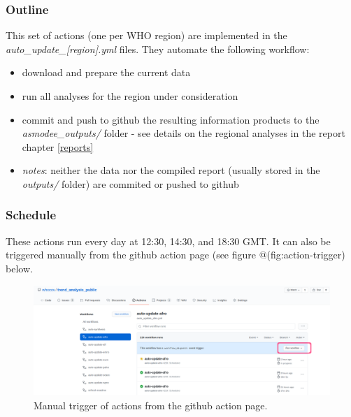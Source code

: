 \documentclass[]{book}
\providecommand{\tightlist}{%
  \setlength{\itemsep}{0pt}\setlength{\parskip}{0pt}}
\begin{document}
\hypertarget{outline}{%
\subsubsection{Outline}\label{outline}}

This set of actions (one per WHO region) are implemented in the
\emph{auto\_update\_{[}region{]}.yml} files. They automate the following workflow:

\begin{itemize}
\tightlist
\item
  download and prepare the current data
\item
  run all analyses for the region under consideration
\item
  commit and push to github the resulting information products to the
  \emph{asmodee\_outputs/} folder - see details on the regional analyses in the report
  chapter \ref{reports}
\item
  \emph{notes}: neither the data nor the compiled report (usually stored in the
  \emph{outputs/} folder) are commited or pushed to github
\end{itemize}

\hypertarget{schedule}{%
\subsubsection{Schedule}\label{schedule}}

These actions run every day at 12:30, 14:30, and 18:30 GMT. It can also be
triggered manually from the github action page (see figure
@(fig:action-trigger) below.

\begin{figure}

{\centering \includegraphics[width=1\linewidth]{images/action_trigger} 

}

\caption{Manual trigger of actions from the github action page.}\label{fig:action-trigger}
\end{figure}
\end{document}
